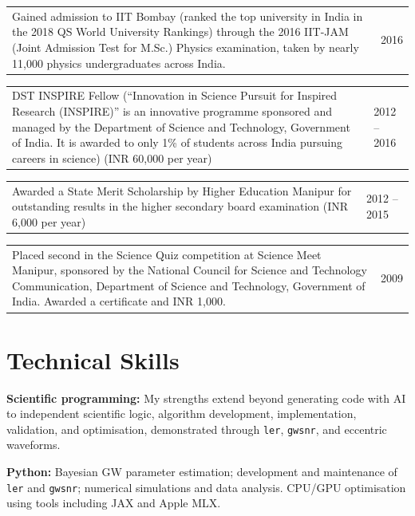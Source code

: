 \documentclass[margin,line]{res}
\begin{document}
\begin{resume}
\begin{tabular}{@{}p{\dimexpr\linewidth-0.62in-3\tabcolsep\relax}p{0.62in}}
Gained admission to IIT Bombay (ranked the top university in India in the 2018 QS World University Rankings) through the 2016 IIT-JAM (Joint Admission Test for M.Sc.) Physics examination, taken by nearly 11,000 physics undergraduates across India. & \raggedright 2016
\end{tabular}

\begin{tabular}{@{}p{\dimexpr\linewidth-0.62in-3\tabcolsep\relax}p{0.62in}}
DST INSPIRE Fellow (“Innovation in Science Pursuit for Inspired Research (INSPIRE)” is an innovative programme sponsored and managed by the Department of Science and Technology, Government of India. It is awarded to only 1\% of students across India pursuing careers in science) (INR 60,000 per year) & \raggedright 2012 -- 2016
\end{tabular}

\begin{tabular}{@{}p{\dimexpr\linewidth-0.62in-3\tabcolsep\relax}p{0.62in}}
Awarded a State Merit Scholarship by Higher Education Manipur for outstanding results in the higher secondary board examination (INR 6,000 per year) & \raggedright 2012 -- 2015
\end{tabular}

\begin{tabular}{@{}p{\dimexpr\linewidth-0.62in-3\tabcolsep\relax}p{0.62in}}
Placed second in the Science Quiz competition at Science Meet Manipur, sponsored by the National Council for Science and Technology Communication, Department of Science and Technology, Government of India. Awarded a certificate and INR 1,000. & \raggedright 2009
\end{tabular}

\vspace{.2in}
\section{\sc Technical Skills}

\textbf{Scientific programming:} My strengths extend beyond generating code with AI to independent scientific logic, algorithm development, implementation, validation, and optimisation, demonstrated through \texttt{ler}, \texttt{gwsnr}, and eccentric waveforms.

\textbf{Python:} Bayesian GW parameter estimation; development and maintenance of \texttt{ler} and \texttt{gwsnr}; numerical simulations and data analysis. CPU/GPU optimisation using tools including JAX and Apple MLX.


\end{resume}
\end{document}
